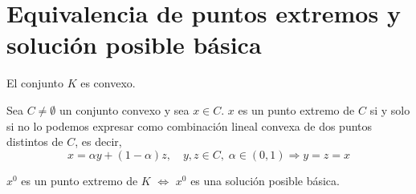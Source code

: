 \section{Equivalencia de puntos extremos y solución posible básica}
\begin{theorem}
    El conjunto $K$ es convexo.
\end{theorem}

\begin{definition}
    Sea $C \neq \emptyset$ un conjunto convexo y sea $x \in C$.
    $x$ es un punto extremo de $C$ si y solo si no lo podemos expresar como combinación lineal convexa de dos puntos distintos de $C$, es decir,
    $$x = \alpha y + (1-\alpha)z, \quad y, z \in C, \; \alpha \in (0, 1) \Rightarrow y = z = x$$
\end{definition}

\begin{theorem}
    $x^0$ es un punto extremo de $K$ $\Leftrightarrow$ $x^0$ es una solución posible básica.
\end{theorem}

